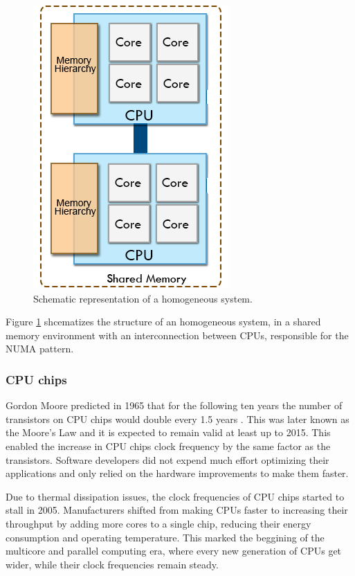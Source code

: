 \begin{figure}[!htp]
	\begin{center}
		\includegraphics[scale=0.4]{../../common/img/homoplats.png}
		\caption{Schematic representation of a homogeneous system.}
		\label{fig:HomogeneousSystem}
	\end{center}
\end{figure}

Figure \ref{fig:HomogeneousSystem} shcematizes the structure of an homogeneous system, in a shared memory environment with an interconnection between CPUs, responsible for the NUMA pattern.

\subsubsection*{CPU chips}
\label{CPUChips}

Gordon Moore predicted in 1965 that for the following ten years the number of transistors on CPU chips would double every 1.5 years \cite{MooreLaw}. This was later known as the Moore's Law and it is expected to remain valid at least up to 2015. This enabled the increase in CPU chips clock frequency by the same factor as the transistors. Software developers did not expend much effort optimizing their applications and only relied on the hardware improvements to make them faster.

Due to thermal dissipation issues, the clock frequencies of CPU chips started to stall in 2005. Manufacturers shifted from making CPUs faster to increasing their throughput by adding more cores to a single chip, reducing their energy consumption and operating temperature. This marked the beggining of the multicore and parallel computing era, where every new generation of CPUs get wider, while their clock frequencies remain steady.

